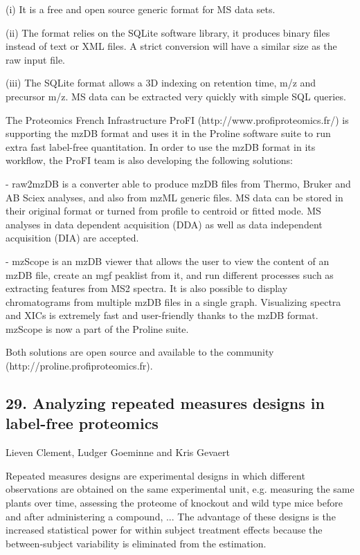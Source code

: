 (i) It is a free and open source generic format for MS data sets.

(ii) The format relies on the SQLite software library, it produces binary files instead of text or XML files. A strict conversion will have a similar size as the raw input file.

(iii) The SQLite format allows a 3D indexing on retention time, m/z and precursor m/z. MS data can be extracted very quickly with simple SQL queries.


The Proteomics French Infrastructure ProFI (http://www.profiproteomics.fr/) is supporting the mzDB format and uses it in the Proline software suite to run extra fast label-free quantitation. In order to use the mzDB format in its workflow, the ProFI team is also developing the following solutions:

- raw2mzDB is a converter able to produce mzDB files from Thermo, Bruker and AB Sciex analyses, and also from mzML generic files. MS data can be stored in their original format or turned from profile to centroid or fitted mode. MS analyses in data dependent acquisition (DDA) as well as data independent acquisition (DIA) are accepted.

- mzScope is an mzDB viewer that allows the user to view the content of an mzDB file, create an mgf peaklist from it, and run different processes such as extracting features from MS2 spectra. It is also possible to display chromatograms from multiple mzDB files in a single graph. Visualizing spectra and XICs is extremely fast and user-friendly thanks to the mzDB format. mzScope is now a part of the Proline suite.

Both solutions are open source and available to the community (http://proline.profiproteomics.fr).

\subsection*{\color{eubicRed} 29. Analyzing repeated measures designs in label-free proteomics}
{\color{eubicGray}Lieven Clement, Ludger Goeminne and Kris Gevaert}

Repeated measures designs are experimental designs in which different observations are obtained on the same experimental unit, e.g. measuring the same plants over time, assessing the proteome of knockout and wild type mice before and after administering a compound, ...
The advantage of these designs is the increased statistical power for within subject treatment effects because the between-subject variability is eliminated from the estimation.

